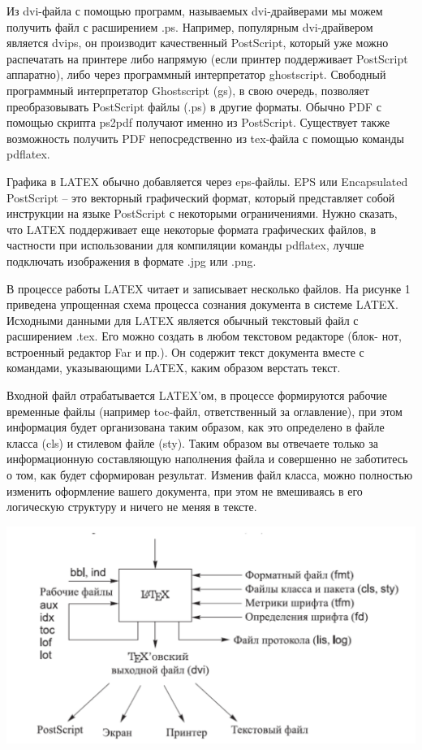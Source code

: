 \documentclass[a4peper,12pt]{report}
\begin{document}
Из dvi-файла с помощью программ, называемых dvi-драйверами мы можем получить файл с расширением .ps. Например, популярным dvi-драйвером является dvips, он производит качественный PostScript, который уже можно распечатать на принтере либо напрямую (если принтер поддерживает PostScript аппаратно), либо через программный интерпретатор ghostscript. Свободный программный интерпретатор Ghostscript (gs), в свою очередь, позволяет преобразовывать PostScript файлы (.ps) в другие форматы. Обычно PDF с помощью скрипта ps2pdf получают именно из PostScript. Существует также возможность получить PDF непосредственно из tex-файла с помощью команды pdflatex. 

Графика в LATEX обычно добавляется через eps-файлы. EPS или Encapsulated PostScript – это векторный графический формат, который представляет собой инструкции на языке PostScript с некоторыми ограничениями. Нужно сказать, что LATEX поддерживает еще некоторые формата графических файлов, 
в частности при использовании для компиляции команды pdflatex, лучше подключать изображения в формате .jpg или .png. 

В процессе работы LATEX читает и записывает несколько файлов. На рисунке 1 приведена упрощенная схема процесса сознания документа в системе LATEX. Исходными данными для LATEX является обычный текстовый файл с расширением .tex. Его можно создать в любом текстовом редакторе (блок- нот, встроенный редактор Far и пр.). Он содержит текст документа вместе с командами, указывающими LATEX, каким образом верстать текст. 

Входной файл отрабатывается LATEX’ом, в процессе формируются рабочие временные файлы (например toc-файл, ответственный за оглавление), при этом информация будет организована таким образом, как это определено в файле класса (cls) и стилевом файле (sty). Таким образом вы отвечаете только за информационную составляющую наполнения файла и совершенно не заботитесь о том, как будет сформирован результат. Изменив файл класса, можно полностью изменить оформление вашего документа, при этом не вмешиваясь в его логическую структуру и ничего не меняя в тексте.

\includegraphics[scale=0.4]{img-1}
\end{document}
